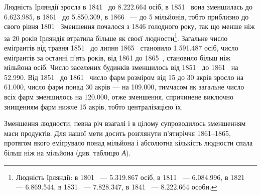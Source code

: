 
Людність Ірляндії зросла в 1841~ до \num{8.222.664} осіб, в 1851~
вона зменшилась до \num{6.623.985}, в 1861~ до \num{5.850.309}, в 1866~ —
до 5 мільйонів, тобто приблизно до свого рівня 1801~ Зменшення
почалося з 1846 голодного року, так що менше ніж за
20 років Ірляндія втратила більше як  своєї людности\footnote{
Людність Ірляндії: в 1801~ — \num{5.319.867} осіб, в 1811~ — \num{6.084.996},
в 1821~ — \num{6.869.544}, в 1831~ — \num{7.828.347}, в 1841~ — \num{8.222.664} особи.
}.
Загальне число еміґрантів від травня 1851~ до липня 1865~
становило \num{1.591.487} осіб, число еміґрантів за останні п’ять років,
від 1861 до 1865~, становило більш ніж  мільйона осіб. Число
заселених будинків зменшилось від 1851~ до 1861~ на \num{52.990}.
Від 1851~ до 1861~ число фарм розміром від 15 до 30 акрів зросло
на \num{61.000}, число фарм понад 30 акрів — на \num{109.000}, тимчасом
як загальне число всіх фарм зменшилось на \num{120.000}, отже зменшення,
спричинене виключно знищенням фарм нижче 15 акрів,
тобто централізацією їх.

Зменшення людности, певна річ взагалі і в цілому супроводилось
зменшенням маси продуктів. Для нашої мети досить
розглянути п’ятиріччя 1861--1865, протягом якого еміґрувало
понад  мільйона і абсолютна кількість людности спала
більш ніж на  мільйона (див. таблицю \emph{А}).

